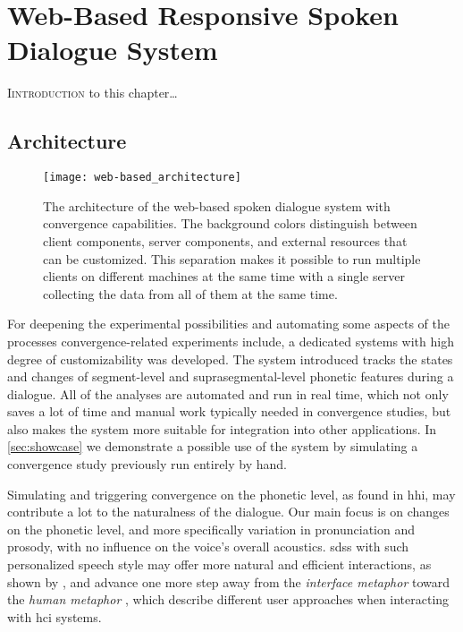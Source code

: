 \chapter{Web-Based Responsive Spoken Dialogue System}
\label{chap:web-based_responsive_spoken_dialogue_system}

\lettrine{I}{introduction} to this chapter\ldots

\pagebreak

\section{Architecture}
\label{sec:architecture_web-based}

\begin{figure}[t]
	\centering
	\texttt{[image: web-based\_architecture]}
	\caption[Architecture of a web-based system with convergence capabilities] {
		The architecture of the web-based spoken dialogue system with convergence capabilities.
		The background colors distinguish between client components, server components, and external resources that can be customized.
		This separation makes it possible to run multiple clients on different machines at the same time with a single server collecting the data from all of them at the same time.
	}
	\label{fig:web-based_architecture}
\end{figure}

For deepening the experimental possibilities and automating some aspects of the processes convergence-related experiments include, a dedicated systems with high degree of customizability was developed.
The system introduced tracks the states and changes of segment-level and suprasegmental-level phonetic features during a dialogue.
All of the analyses are automated and run in real time, which not only saves a lot of time and manual work typically needed in convergence studies, but also makes the system more suitable for integration into other applications.
In \cref{sec:showcase} we demonstrate a possible use of the system by simulating a convergence study previously run entirely by hand.

Simulating and triggering convergence on the phonetic level, as found in \ac{hhi}, may contribute a lot to the naturalness of the dialogue.
Our main focus is on changes on the phonetic level, and more specifically variation in pronunciation and prosody, with no influence on the voice's overall acoustics.
\Acp{sds} with such personalized speech style may offer more natural and efficient interactions, as shown by \citet{Porzel2006entrainment}, and advance one more step away from the \emph{interface metaphor} \citep{Edlund2006twofaces} toward the \emph{human metaphor} \citep{Carlson2006humanlike}, which describe different user approaches when interacting with \ac{hci} systems.

